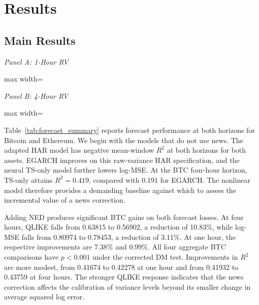 \section{Results}\label{sec:results}
\subsection{Main Results}
\begin{table}[htbp]
\centering\small
\caption{Out-of-Sample Forecast Performance}\label{tab:forecast_summary}
\textit{Panel A: 1-Hour RV}\par\smallskip
\begin{adjustbox}{max width=\textwidth}\end{adjustbox}
\par\medskip
\textit{Panel B: 4-Hour RV}\par\smallskip
\begin{adjustbox}{max width=\textwidth}\end{adjustbox}
\end{table}

Table~\ref{tab:forecast_summary} reports forecast performance at both
horizons for Bitcoin and Ethereum. We begin with the models that do
not use news. The adapted HAR model has negative mean-window $R^2$
at both horizons for both assets. EGARCH improves on this raw-variance
HAR specification, and the neural TS-only model further lowers
log-MSE. At the BTC four-hour horizon, TS-only attains
$R^2=0.419$, compared with 0.191 for EGARCH. The nonlinear model
therefore provides a demanding baseline against which to assess
the incremental value of a news correction.

Adding NED produces significant BTC gains on both forecast losses.
At four hours, QLIKE falls from 0.63815 to 0.56902, a reduction of
10.83\%, while log-MSE falls from 0.80974 to 0.78453, a reduction
of 3.11\%. At one hour, the respective improvements are 7.38\%
and 0.99\%. All four aggregate BTC comparisons have $p<0.001$
under the corrected DM test. Improvements in $R^2$ are more modest,
from 0.41674 to 0.42278 at one hour and from 0.41932 to 0.43759
at four hours. The stronger QLIKE response indicates that the news
correction affects the calibration of variance levels beyond its
smaller change in average squared log error.

